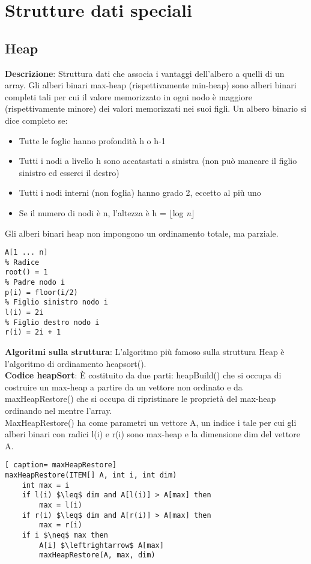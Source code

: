 \documentclass[../cheatSheetAlgoritmi.tex]{subfiles}
\begin{document}
\section{Strutture dati speciali}
\subsection{Heap}
\textbf{Descrizione}: Struttura dati che associa i vantaggi dell'albero a quelli di un array. Gli alberi binari max-heap (rispettivamente min-heap) sono alberi binari completi tali per cui il valore memorizzato in ogni nodo è maggiore (rispettivamente minore) dei valori memorizzati nei suoi figli. Un albero binario si dice completo se:
\begin{itemize}
 	\item Tutte le foglie hanno profondità h o h-1 
 	\item Tutti i nodi a livello h sono accatastati a sinistra (non può mancare il figlio sinistro ed esserci il destro)
 	\item Tutti i nodi interni (non foglia) hanno grado 2, eccetto al più uno
 	\item Se il numero di nodi è n, l'altezza è h = $\lfloor$log \textit{n}$\rfloor$
\end{itemize}
Gli alberi binari heap non impongono un ordinamento totale, ma parziale. \
\begin{lstlisting}[caption= Memorizzazione Heap con Vettore]
% Vettore di memorizzazione
A[1 ... n]
% Radice
root() = 1
% Padre nodo i
p(i) = floor(i/2)
% Figlio sinistro nodo i
l(i) = 2i
% Figlio destro nodo i
r(i) = 2i + 1
\end{lstlisting}
\textbf{Algoritmi sulla struttura}: L'algoritmo più famoso sulla struttura Heap è l'algoritmo di ordinamento heapsort(). \\
\textbf{Codice heapSort}: È costituito da due parti: heapBuild() che si occupa di costruire un max-heap a partire da un vettore non ordinato e da maxHeapRestore() che si occupa di ripristinare le proprietà del max-heap ordinando nel mentre l'array.  \\
MaxHeapRestore() ha come parametri un vettore A, un indice i tale per cui gli alberi binari con radici l(i) e r(i) sono max-heap e la dimensione dim del vettore A. 
\begin{lstlisting}[ caption= maxHeapRestore]
maxHeapRestore(ITEM[] A, int i, int dim)
	int max = i
	if l(i) $\leq$ dim and A[l(i)] > A[max] then
		max = l(i)
	if r(i) $\leq$ dim and A[r(i)] > A[max] then
		max = r(i)
	if i $\neq$ max then
		A[i] $\leftrightarrow$ A[max]
		maxHeapRestore(A, max, dim)
\end{lstlisting}
\end{document}
